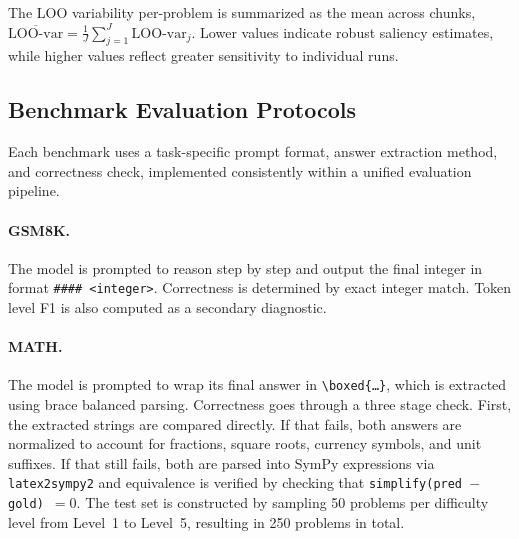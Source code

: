 \documentclass[12pt]{report}
\begin{document}
The LOO variability per-problem is summarized as the mean across chunks,
$\overline{\mathrm{LOO\text{-}var}} = \frac{1}{J}\sum_{j=1}^{J} \mathrm{LOO\text{-}var}_j$.
Lower values indicate robust saliency estimates, while higher values
reflect greater sensitivity to individual runs.


\subsection{Benchmark Evaluation Protocols}
\label{sec:eval_protocols}

Each benchmark uses a task-specific prompt format, answer extraction method, and correctness check, implemented consistently within a unified evaluation pipeline.

\paragraph{GSM8K.}
The model is prompted to reason step by step and output the final integer in format \texttt{\#\#\#\# <integer>}. Correctness is determined by exact integer match. 
Token level F1 is also computed as a secondary diagnostic.

\paragraph{MATH.}
The model is prompted to wrap its final answer in \texttt{\textbackslash boxed\{\dots\}}, which is extracted using brace balanced parsing. Correctness goes through a three stage check. First, the extracted strings are compared directly. If that fails, both answers are normalized to account for fractions, square roots, currency symbols, and unit suffixes. If that still fails, both are parsed into SymPy expressions via \texttt{latex2sympy2} and equivalence is verified by checking that \texttt{simplify(pred $-$ gold) $= 0$}. The test set is constructed by sampling 50 problems per difficulty level from Level~1 to Level~5, resulting in 250 problems in total.
\end{document}
